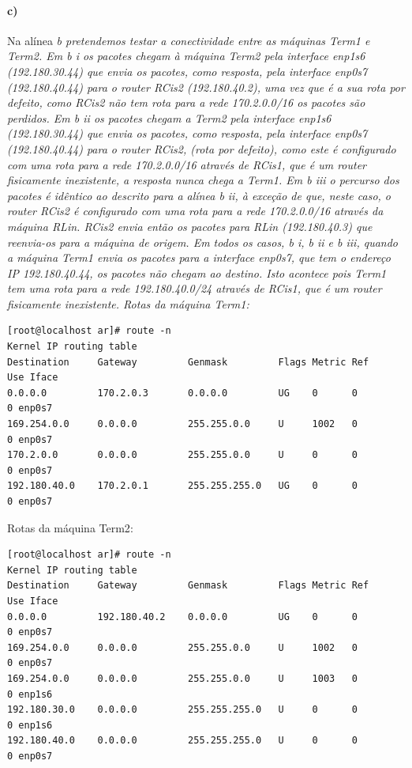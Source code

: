 \paragraph{c)}
Na alínea \it{b} pretendemos testar a conectividade entre as máquinas \textsf{Term1} e \textsf{Term2}.
Em \it{b i} os pacotes chegam à máquina \textsf{Term2} pela interface enp1s6 (192.180.30.44) que envia os pacotes, como resposta, pela interface enp0s7 (192.180.40.44) para o \emph{router} \textsf{RCis2} (192.180.40.2), uma vez que é a sua rota por defeito, como \textsf{RCis2} não tem rota para a rede 170.2.0.0/16 os pacotes são perdidos.
Em \it{b ii} os pacotes chegam a \textsf{Term2} pela interface enp1s6 (192.180.30.44) que envia os pacotes, como resposta, pela interface enp0s7 (192.180.40.44) para o \emph{router} \textsf{RCis2}, (rota por defeito), como este é configurado com uma rota para a rede 170.2.0.0/16 através de \textsf{RCis1}, que é um \emph{router} fisicamente inexistente, a resposta nunca chega a \textsf{Term1}.
Em \it{b iii} o percurso dos pacotes é idêntico ao descrito para a alínea \it{b ii}, à exceção de que, neste caso, o \emph{router} \textsf{RCis2} é configurado com uma rota para a rede 170.2.0.0/16 através da máquina \textsf{RLin}. \textsf{RCis2} envia então os pacotes para \textsf{RLin} (192.180.40.3) que reenvia-os para a máquina de origem.
Em todos os casos, \it{b i}, \it{b ii} e \it{b iii}, quando a máquina \textsf{Term1} envia os pacotes para a interface enp0s7, que tem o endereço IP 192.180.40.44, os pacotes não chegam ao destino. Isto acontece pois \textsf{Term1} tem uma rota para a rede 192.180.40.0/24 através de \textsf{RCis1}, que é um \emph{router} fisicamente inexistente.
\newpage
Rotas da máquina \textsf{Term1}:
\begin{verbatim}
[root@localhost ar]# route -n
Kernel IP routing table
Destination     Gateway         Genmask         Flags Metric Ref    Use Iface
0.0.0.0         170.2.0.3       0.0.0.0         UG    0      0        0 enp0s7
169.254.0.0     0.0.0.0         255.255.0.0     U     1002   0        0 enp0s7
170.2.0.0       0.0.0.0         255.255.0.0     U     0      0        0 enp0s7
192.180.40.0    170.2.0.1       255.255.255.0   UG    0      0        0 enp0s7
\end{verbatim}

Rotas da máquina \textsf{Term2}:
\begin{verbatim}
[root@localhost ar]# route -n
Kernel IP routing table
Destination     Gateway         Genmask         Flags Metric Ref    Use Iface
0.0.0.0         192.180.40.2    0.0.0.0         UG    0      0        0 enp0s7
169.254.0.0     0.0.0.0         255.255.0.0     U     1002   0        0 enp0s7
169.254.0.0     0.0.0.0         255.255.0.0     U     1003   0        0 enp1s6
192.180.30.0    0.0.0.0         255.255.255.0   U     0      0        0 enp1s6
192.180.40.0    0.0.0.0         255.255.255.0   U     0      0        0 enp0s7
\end{verbatim}

